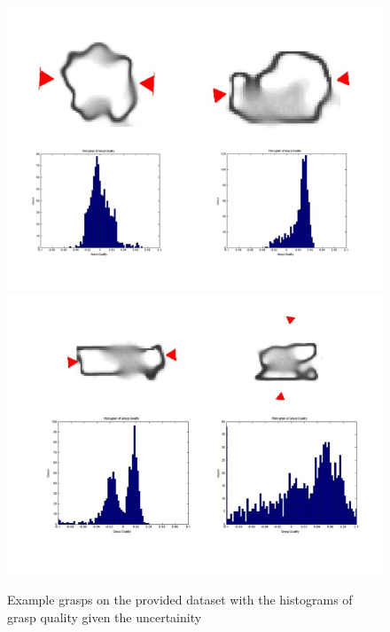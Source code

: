 \documentclass[letterpaper, 10 pt, conference]{ieeeconf}  %
\begin{document}
\begin{figure}[ht!]
\centering
\includegraphics[scale = 0.3]{figures/Slide09.jpg} \includegraphics[scale = 0.3]{figures/Slide10.jpg}
\caption{Example grasps on the provided dataset with the histograms of grasp quality given the uncertainity}
\vspace*{-10pt}
\label{fig:Grasps}
\end{figure}
\end{document}
